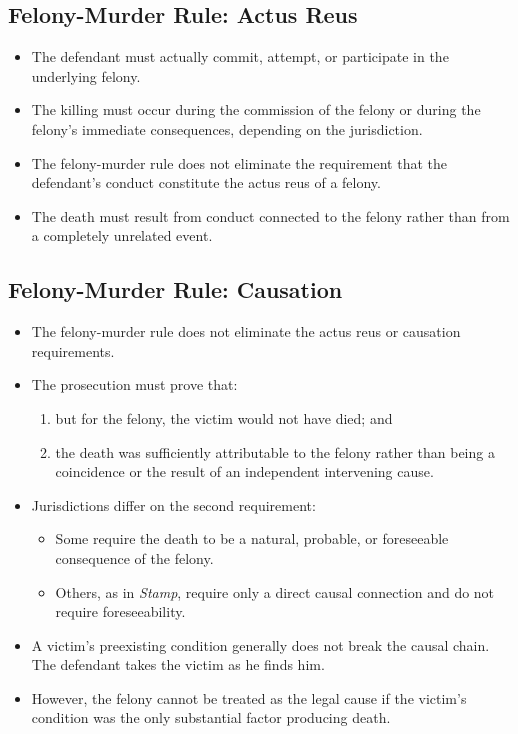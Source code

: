 \documentclass[11pt]{tex/lawoutline}
\begin{document}
\subsection{Felony-Murder Rule: Actus Reus}
\begin{itemize}
    \item The defendant must actually commit, attempt, or participate in the underlying felony.
    \item The killing must occur during the commission of the felony or during the felony's immediate consequences, depending on the jurisdiction.
    \item The felony-murder rule does not eliminate the requirement that the defendant's conduct constitute the actus reus of a felony.
    \item The death must result from conduct connected to the felony rather than from a completely unrelated event.
\end{itemize}

\subsection{Felony-Murder Rule: Causation}
\begin{itemize}
    \item The felony-murder rule does not eliminate the actus reus or causation requirements.
    \item The prosecution must prove that:
    \begin{enumerate}
        \item but for the felony, the victim would not have died; and
        \item the death was sufficiently attributable to the felony rather than being a coincidence or the result of an independent intervening cause.
    \end{enumerate}
    \item Jurisdictions differ on the second requirement:
    \begin{itemize}
        \item Some require the death to be a natural, probable, or foreseeable consequence of the felony.
        \item Others, as in \textit{Stamp}, require only a direct causal connection and do not require foreseeability.
    \end{itemize}
    \item A victim's preexisting condition generally does not break the causal chain. The defendant takes the victim as he finds him.
    \item However, the felony cannot be treated as the legal cause if the victim's condition was the only substantial factor producing death.
\end{itemize}
\end{document}
